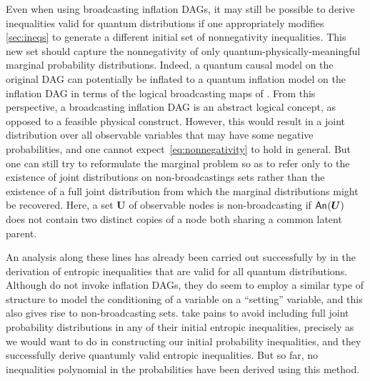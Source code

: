 Even when using broadcasting inflation DAGs, it may still be possible to derive inequalities valid for quantum distributions if one appropriately modifies \cref{sec:ineqs} to generate a different initial set of nonnegativity inequalities. This new set should capture the nonnegativity of only quantum-physically-meaningful marginal probability distributions. Indeed, a quantum causal model on the original DAG can potentially be inflated to a quantum inflation model on the inflation DAG in terms of the logical broadcasting maps of \citet{Coecke2011}. From this perspective, a broadcasting inflation DAG is an abstract logical concept, as opposed to a feasible physical construct. However, this would result in a joint distribution over all observable variables that may have some negative probabilities, and one cannot expect~\cref{eq:nonnegativity} to hold in general. But one can still try to reformulate the marginal problem so as to refer only to the existence of joint distributions on non-broadcastings sets rather than the existence of a full joint distribution from which the marginal distributions might be recovered. Here, a set $\bm{U}$ of observable nodes is non-broadcasting if ${\mathsf{An}_{}}\lparen\bm{U}\rparen$ does not contain two distinct copies of a node both sharing a common latent parent.

An analysis along these lines has already been carried out successfully by \citet{Chaves2015infoquantum} in the derivation of entropic inequalities that are valid for all quantum distributions. Although \citet{Chaves2015infoquantum} do not invoke inflation DAGs, they do seem to employ a similar type of structure to model the conditioning of a variable on a ``setting'' variable, and this also gives rise to non-broadcasting sets. \citet{Chaves2015infoquantum} take pains to avoid including full joint probability distributions in any of their initial entropic inequalities, precisely as we would want to do in constructing our initial probability inequalities, and they successfully derive quantumly valid entropic inequalities. But so far, no inequalities polynomial in the probabilities have been derived using this method.


